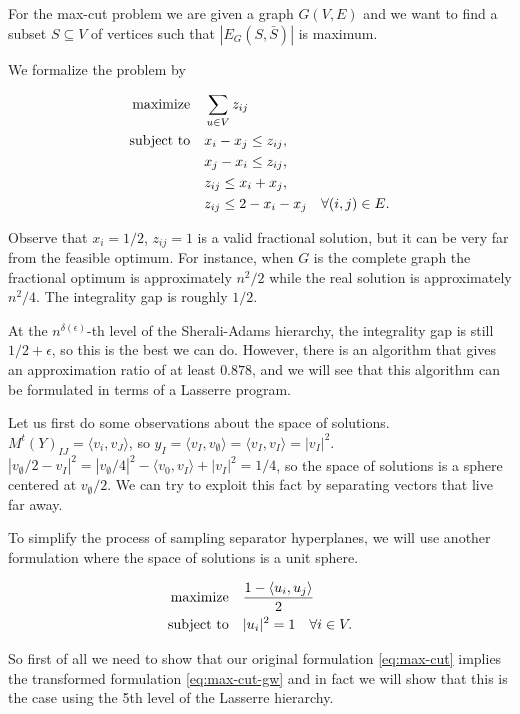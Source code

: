 \documentclass[a4paper,twoside,justified]{tufte-handout}
\begin{document}
For the max-cut problem we are given a graph $G(V,E)$ and we want to find a subset $S \subseteq V$ of vertices such that $|E_G(S,\bar S)|$ is maximum.

We formalize the problem by

\begin{alignat}{2}
\label{eq:max-cut}
  \text{maximize}\hspace{1em}& \sum_{u\in V} z_{ij}\notag \\
  \text{subject to}\hspace{1em}& x_i - x_j \leq z_{ij},\notag \\
& x_j - x_i \leq z_{ij},\notag \\
& z_{ij} \leq x_i + x_j,\notag \\
& z_{ij} \leq 2 - x_i - x_j \quad \forall{(i,j)\in E}.
\end{alignat}

Observe that $x_i=1/2$, $z_{ij}=1$ is a valid fractional solution, but it can be very far from the feasible optimum. For instance, when $G$ is the complete graph the fractional optimum is approximately $n^2/2$ while the real solution is approximately $n^2/4$. The integrality gap is roughly $1/2$.

At the $n^{\delta(\epsilon)}$-th level of the Sherali-Adams hierarchy, the integrality gap is still $1/2+\epsilon$\cite{CMM09}, so this is the best we can do. However, there is an algorithm that gives an approximation ratio of at least $0.878$\cite{GW95}, and we will see that this algorithm can be formulated in terms of a Lasserre program.

Let us first do some observations about the space of solutions. $M^t(Y)_{IJ}=\langle v_i, v_J \rangle$, so $y_I=\langle v_I,v_\emptyset \rangle = \langle v_I,v_I \rangle = | v_I |^2$. $|v_\emptyset/2-v_I|^2=|v_\emptyset/4|^2-\langle v_0,v_I\rangle+|v_I|^2=1/4$, so the space of solutions is a sphere centered at $v_\emptyset/2$. We can try to exploit this fact by separating vectors that live far away.

To simplify the process of sampling separator hyperplanes, we will use another formulation where the space of solutions is a unit sphere.

\begin{alignat}{2}
\label{eq:max-cut-gw}
  \text{maximize}\hspace{1em}& \frac{1- \langle u_i,u_j \rangle}{2}\notag \\
  \text{subject to}\hspace{1em}& |u_i|^2 = 1 \quad \forall i\in V.
\end{alignat}

So first of all we need to show that our original formulation \eqref{eq:max-cut} implies the transformed formulation \eqref{eq:max-cut-gw} and in fact we will show that this is the case using the 5th level of the Lasserre hierarchy.
\end{document}

